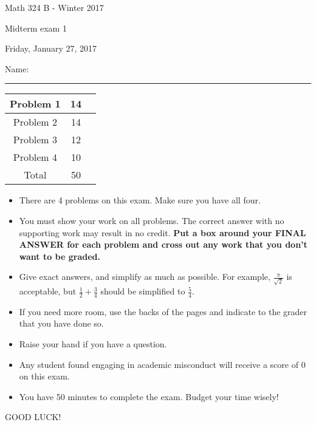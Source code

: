 \documentclass[12 pt]{report}
\begin{document}
\noindent \vfill \noindent \large

\centerline{Math 324 B  - Winter 2017}

\centerline{Midterm exam 1}

\centerline{Friday, January 27, 2017}

\normalsize

\vfill
\medskip
Name: \rule{10cm}{1pt}

\bigskip

\vfill
\begin{center}
{\large
\begin{tabular}{||c|c|r||}
\hline Problem 1 & 14 & \hspace{10mm} \hfill \\
\hline Problem 2 & 14 & \hspace{10mm} \hfill \\
\hline Problem 3 & 12 & \hspace{10mm} \hfill \\
\hline Problem 4 & 10  & \hspace{10mm} \hfill \\
\hline Total & 50 & \hspace{10mm} \hfill \\
\hline
\end{tabular}
}
\end{center}
\vfill
\begin{itemize}
\item There are 4 problems on this exam. Make sure you have all four.
\item You must show your work on all problems.  The correct answer
with no supporting work may result in no credit. \textbf{Put a box
around your FINAL ANSWER for each problem and cross out any work
that you don't want to be graded.} 
\item Give exact answers, and simplify as much as possible. 
For example, $\frac{\pi}{\sqrt{2}}$ is acceptable, but $\frac{1}{2} + \frac{3}{4}$
should be simplified to $\frac{5}{4}$.   

\item If you need more room, use the backs
of the pages and indicate to the grader that you have done so.
\item Raise your hand if you have a question.
\item Any student found engaging in academic misconduct will receive
a score of 0 on this exam.
\item You have 50 minutes to complete the exam.  Budget your time wisely! \\
\end{itemize}
\vfill
\begin{center}GOOD LUCK!\end{center}
\end{document}
